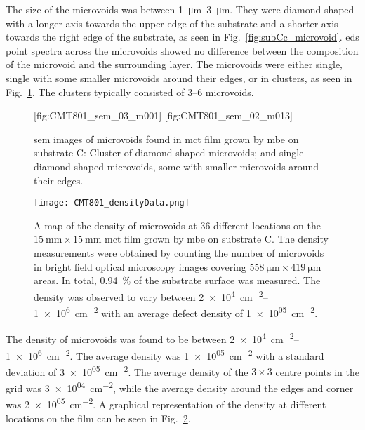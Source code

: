 The size of the microvoids was between \SIrange{1}{3}{\micro\metre}. They were diamond-shaped with a longer axis towards the upper edge of the substrate and a shorter axis towards the right edge of the substrate, as seen in Fig.~\ref{fig:subCc_microvoid}. \Ac{eds} point spectra across the microvoids showed no difference between the composition of the microvoid and the surrounding layer. The microvoids were either single, single with some smaller microvoids around their edges, or in clusters, as seen in Fig.~\ref{fig:subCc_sem_microvoids}. The clusters typically consisted of \SIrange{3}{6}{} microvoids. %

\begin{figure}[htbp]
    \centering
    [fig:CMT801_sem_03_m001]
    \hfill
    [fig:CMT801_sem_02_m013]
    \caption[\Ac{sem} images of microvoids found in \ac{mct} film grown by \ac{mbe} on substrate C.]{\Ac{sem} images of microvoids found in \ac{mct} film grown by \ac{mbe} on substrate C:  Cluster of diamond-shaped microvoids; and  single diamond-shaped microvoids, some with smaller microvoids around their edges.}
    \label{fig:subCc_sem_microvoids}
\end{figure}

\begin{figure}[htbp]
    \centering
    \texttt{[image: CMT801\_densityData.png]}
    \caption[Map of the density of microvoids on the \ac{mct} film grown on substrate C.]{A map of the density of microvoids at 36 different locations on the $\SI{15}{\milli\metre}\times\SI{15}{\milli\metre}$ \ac{mct} film grown by \ac{mbe} on substrate C. The density measurements were obtained by counting the number of microvoids in bright field optical microscopy images covering $\SI{558}{\micro\metre}\times\SI{419}{\micro\metre}$ areas. In total, \SI{0.94}{\percent} of the substrate surface was measured. The density was observed to vary between \SIrange{2e+4}{1e+6}{\centi\metre^{-2}} with an average defect density of \SI{1e+05}{\centi\metre^{-2}}.}
    \label{fig:CMT801_densityData}
\end{figure}

The density of microvoids was found to be between \SIrange{2e+4}{1e+6}{\centi\metre^{-2}}. The average density was \SI{1e+05}{\centi\metre^{-2}} with a standard deviation of \SI{3e+05}{\centi\metre^{-2}}. The average density of the $3\times3$ centre points in the grid was \SI{3e+04}{\centi\metre^{-2}}, while the average density around the edges and corner was \SI{2e+05}{\centi\metre^{-2}}. A graphical representation of the density at different locations on the film can be seen in Fig.~\ref{fig:CMT801_densityData}. 

